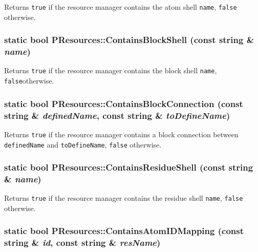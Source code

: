 Returns {\tt true} if the resource manager contains the atom shell {\tt name}, {\tt false} otherwise. 
\subsubsection{\setlength{\rightskip}{0pt plus 5cm}static bool PResources::Contains\-Block\-Shell (const string \& {\em name})\hspace{0.3cm}{\tt  [inline, static]}}\label{classPResources_ec65368e8f97cd1fe332019ac959ac23}


Returns {\tt true} if the resource manager contains the block shell {\tt name}, {\tt false}otherwise. 
\subsubsection{\setlength{\rightskip}{0pt plus 5cm}static bool PResources::Contains\-Block\-Connection (const string \& {\em defined\-Name}, const string \& {\em to\-Define\-Name})\hspace{0.3cm}{\tt  [inline, static]}}\label{classPResources_8cd0857387e6ccf9744577b661c51b30}


Returns {\tt true} if the resource manager contains a block connection between {\tt defined\-Name} and {\tt to\-Define\-Name}, {\tt false} otherwise. 
\subsubsection{\setlength{\rightskip}{0pt plus 5cm}static bool PResources::Contains\-Residue\-Shell (const string \& {\em name})\hspace{0.3cm}{\tt  [inline, static]}}\label{classPResources_d1175f8f4b667b4340ca7f242b0404ad}


Returns {\tt true} if the resource manager contains the residue shell {\tt name}, {\tt false} otherwise. 
\subsubsection{\setlength{\rightskip}{0pt plus 5cm}static bool PResources::Contains\-Atom\-IDMapping (const string \& {\em id}, const string \& {\em res\-Name})\hspace{0.3cm}{\tt  [inline, static]}}\label{classPResources_0e4fe012e67fd3a4106daa5faef4ace9}


